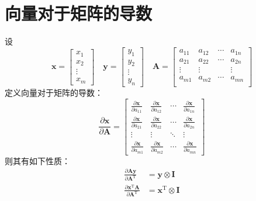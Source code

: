 \documentclass[UTF8,space=auto]{ctexart} %
\begin{document}
\section{向量对于矩阵的导数}
设
\[
\mathbf{x} =
\begin{bmatrix}
	x_1 \\ x_2 \\ \vdots \\ x_m
\end{bmatrix}\quad
\mathbf{y} =
\begin{bmatrix}
	y_1 \\ y_2 \\ \vdots \\ y_n
\end{bmatrix}\quad
\mathbf{A} =
\begin{bmatrix}
	a_{11} & a_{12} & \cdots & a_{1n} \\
	a_{21} & a_{22} & \cdots & a_{2n} \\
	\vdots & \vdots & & \vdots \\
	a_{m1} & a_{m2} & \cdots & a_{mn} \\
\end{bmatrix}
\]
定义向量对于矩阵的导数：
\[
\frac{\partial\mathbf{x}}{\partial\mathbf{A}}
= \begin{bmatrix}
	\frac{\partial \mathbf{x}}{\partial a_{11}} & \frac{\partial \mathbf{x}}{\partial a_{12}} & \cdots & \frac{\partial \mathbf{x}}{\partial a_{1n}} \\
	\frac{\partial \mathbf{x}}{\partial a_{21}} & \frac{\partial \mathbf{x}}{\partial a_{22}} & \cdots & \frac{\partial \mathbf{x}}{\partial a_{2n}} \\
	\vdots & \vdots & \ddots & \vdots \\
	\frac{\partial \mathbf{x}}{\partial a_{m1}} & \frac{\partial \mathbf{x}}{\partial a_{m2}} & \cdots & \frac{\partial \mathbf{x}}{\partial a_{mn}}
\end{bmatrix}
\]
则其有如下性质：
\begin{align}
\frac{\partial \mathbf{A} \mathbf{y}}{\partial \mathbf{A}^{\mathrm{T}}}&=\mathbf{y} \otimes \mathbf{I} \\
\frac{\partial \mathbf{x}^{\mathrm{T}} \mathbf{A}}{\partial \mathbf{A}^{\mathrm{T}}} &= \mathbf{x}^{\mathrm{T}} \otimes \mathbf{I}
\end{align}
\end{document}
